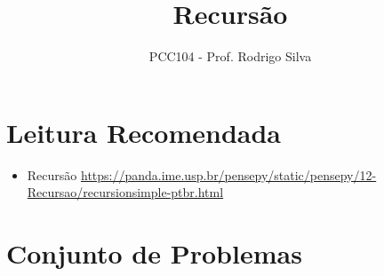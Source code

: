 \documentclass[12pt]{article}
\title{Recursão}
\author{PCC104 - Prof. Rodrigo Silva}
\date{}
\begin{document}
\maketitle
\section*{Leitura Recomendada}

\begin{itemize}
    \item Recursão \url{https://panda.ime.usp.br/pensepy/static/pensepy/12-Recursao/recursionsimple-ptbr.html}
\end{itemize}

\section*{Conjunto de Problemas}
\end{document}
